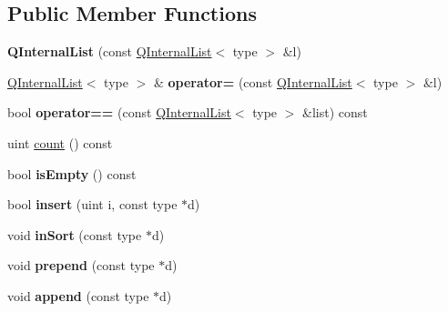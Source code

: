 \subsection*{Public Member Functions}
\begin{DoxyCompactItemize}
\item 
\mbox{\label{class_q_internal_list_abb800946ab7033290a33901b00e0577e}} 
{\bfseries Q\+Internal\+List} (const \mbox{\hyperlink{class_q_internal_list}{Q\+Internal\+List}}$<$ type $>$ \&l)
\item 
\mbox{\label{class_q_internal_list_a355c04fc3d3895ec3ce647e631987cff}} 
\mbox{\hyperlink{class_q_internal_list}{Q\+Internal\+List}}$<$ type $>$ \& {\bfseries operator=} (const \mbox{\hyperlink{class_q_internal_list}{Q\+Internal\+List}}$<$ type $>$ \&l)
\item 
\mbox{\label{class_q_internal_list_aa81ee36376267cc0cd95617dd1e353ba}} 
bool {\bfseries operator==} (const \mbox{\hyperlink{class_q_internal_list}{Q\+Internal\+List}}$<$ type $>$ \&list) const
\item 
uint \mbox{\hyperlink{class_q_internal_list_af64a4279703a3aeb1954937cdf2fa1f2}{count}} () const
\item 
\mbox{\label{class_q_internal_list_ae849936520d170af42dc14cff0c4e88a}} 
bool {\bfseries is\+Empty} () const
\item 
\mbox{\label{class_q_internal_list_abba980f96178571e6b956c06a63339ca}} 
bool {\bfseries insert} (uint i, const type $\ast$d)
\item 
\mbox{\label{class_q_internal_list_a53f576343b9a7263676d90ea00cc2279}} 
void {\bfseries in\+Sort} (const type $\ast$d)
\item 
\mbox{\label{class_q_internal_list_add8117593e024e3cade4229c368367ee}} 
void {\bfseries prepend} (const type $\ast$d)
\item 
\mbox{\label{class_q_internal_list_a06107186a072886e7b33cbe3e7f6f4d8}} 
void {\bfseries append} (const type $\ast$d)
\item 

\end{DoxyCompactItemize}
